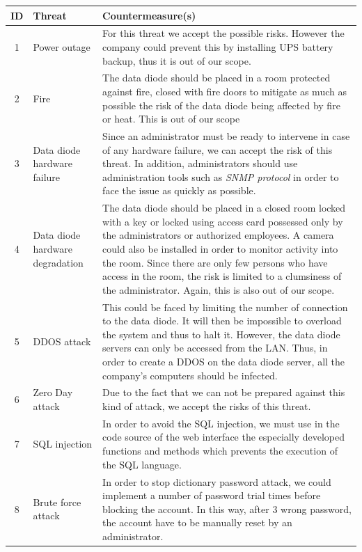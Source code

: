 \documentclass[a4paper,10pt]{article}
\begin{document}
\begin{longtable}{|c|p{2.5cm}|p{12cm}|}
\hline
\textbf{ID}& \textbf{Threat}  & \textbf{Countermeasure(s)} \\
\hline
1 & Power outage  & For this threat we accept the possible risks. However the company could prevent this by installing UPS battery backup, thus it is out of our scope. \\
\hline
2 & Fire & The data diode should be placed in a room protected against fire, closed with fire doors to mitigate as much as possible the risk of the data diode being affected by fire or heat. This is out of our scope \\
\hline
3 & Data diode hardware failure & Since an administrator must be ready to intervene in case of any hardware failure, we can accept the risk of this threat. In addition, administrators should use administration tools such as \emph{SNMP protocol} in order to face the issue as quickly as possible. \\
\hline
4 & Data diode hardware degradation & The data diode should be placed in a closed room locked with a key or locked using access card possessed only by the administrators or authorized employees. A camera could also be installed in order to monitor activity into the room. Since there are only few persons who have access in the room, the risk is limited to a clumsiness of the administrator. Again, this is also out of our scope.\\
\hline
5 & DDOS attack & This could be faced by limiting the number of connection to the data diode. It will then be impossible to overload the system and thus to halt it. However, the data diode servers can only be accessed from the LAN. Thus, in order to create a DDOS on the data diode server, all the company's computers should be infected.  \\
\hline
6 & Zero Day attack & Due to the fact that we can not be prepared against this kind of attack, we accept the risks of this threat.  \\
\hline
7 &  SQL injection & In order to avoid the SQL injection, we must use in the code source of the web interface the especially developed functions and methods which prevents the execution of the SQL language. \\
\hline
8 & Brute force attack & In order to stop dictionary password attack, we could implement a number of password trial times before blocking the account. In this way, after 3 wrong password, the account have to be manually reset by an administrator. \\

\end{longtable}
\end{document}
